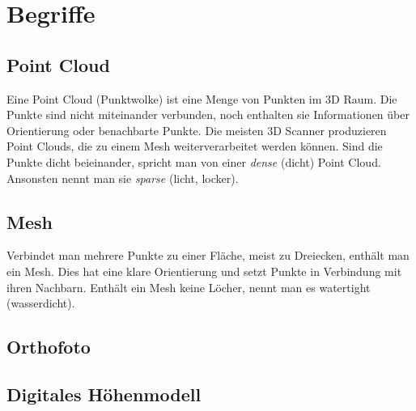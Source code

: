 \chapter{Begriffe}
		\section{Point Cloud}\label{app:point_cloud}
		Eine Point Cloud (Punktwolke) ist eine Menge von Punkten im 3D Raum. Die Punkte sind nicht miteinander verbunden, noch enthalten sie Informationen über Orientierung oder benachbarte Punkte. Die meisten 3D Scanner produzieren Point Clouds, die zu einem Mesh weiterverarbeitet werden können.
		Sind die Punkte dicht beieinander, spricht man von einer \emph{dense} (dicht) Point Cloud. Ansonsten nennt man sie \emph{sparse} (licht, locker).
		
		\section{Mesh}\label{app:mesh}
		Verbindet man mehrere Punkte zu einer Fläche, meist zu Dreiecken, enthält man ein Mesh. Dies hat eine klare Orientierung und setzt Punkte in Verbindung mit ihren Nachbarn. Enthält ein Mesh keine Löcher, nennt man es watertight (wasserdicht).
		
		\section{Orthofoto} \label{app:orthofoto}
		
		\section{Digitales Höhenmodell} \label{app:dtm}